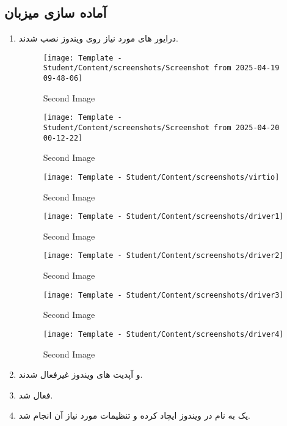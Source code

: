 \subsection*{آماده سازی میزبان}
\begin{enumerate}
\item 
درایور های مورد نیاز روی ویندوز نصب شدند. 
\begin{figure}[htbp]
      \centering
      \texttt{[image: Template - Student/Content/screenshots/Screenshot from 2025-04-19 09-48-06]}
      \caption{Second Image}
      \label{fig:vert2}
\end{figure}
\begin{figure}[htbp]
      \centering
      \texttt{[image: Template - Student/Content/screenshots/Screenshot from 2025-04-20 00-12-22]}
      \caption{Second Image}
      \label{fig:vert2}
\end{figure}
\begin{figure}[htbp]
      \centering
      \texttt{[image: Template - Student/Content/screenshots/virtio]}
      \caption{Second Image}
      \label{fig:vert2}
\end{figure}
\begin{figure}[htbp]
      \centering
      \texttt{[image: Template - Student/Content/screenshots/driver1]}
      \caption{Second Image}
      \label{fig:vert2}
\end{figure}
\begin{figure}[htbp]
      \centering
      \texttt{[image: Template - Student/Content/screenshots/driver2]}
      \caption{Second Image}
      \label{fig:vert2}
\end{figure}
\begin{figure}[htbp]
      \centering
      \texttt{[image: Template - Student/Content/screenshots/driver3]}
      \caption{Second Image}
      \label{fig:vert2}
\end{figure}
\begin{figure}[htbp]
      \centering
      \texttt{[image: Template - Student/Content/screenshots/driver4]}
      \caption{Second Image}
      \label{fig:vert2}
\end{figure}
\item {} و آپدیت های ویندوز غیرفعال شدند.
\item {} فعال شد.
\item یک  به نام  در ویندوز ایچاد کرده و تنظیمات مورد نیاز آن انجام شد.

\end{enumerate}
